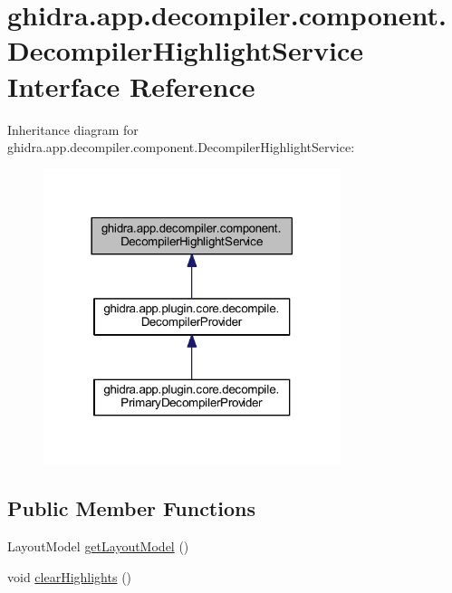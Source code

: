 \hypertarget{interfaceghidra_1_1app_1_1decompiler_1_1component_1_1_decompiler_highlight_service}{}\section{ghidra.\+app.\+decompiler.\+component.\+Decompiler\+Highlight\+Service Interface Reference}
\label{interfaceghidra_1_1app_1_1decompiler_1_1component_1_1_decompiler_highlight_service}


Inheritance diagram for ghidra.\+app.\+decompiler.\+component.\+Decompiler\+Highlight\+Service\+:
\nopagebreak
\begin{figure}[H]
\begin{center}
\leavevmode
\includegraphics[width=246pt]{interfaceghidra_1_1app_1_1decompiler_1_1component_1_1_decompiler_highlight_service__inherit__graph}
\end{center}
\end{figure}
\subsection*{Public Member Functions}
\begin{DoxyCompactItemize}
\item 
Layout\+Model \mbox{\hyperlink{interfaceghidra_1_1app_1_1decompiler_1_1component_1_1_decompiler_highlight_service_a684fe31c749767f23cc40d55d3159e0f}{get\+Layout\+Model}} ()
\item 
void \mbox{\hyperlink{interfaceghidra_1_1app_1_1decompiler_1_1component_1_1_decompiler_highlight_service_af99e44c458009975b48cd1974fd6e727}{clear\+Highlights}} ()
\end{DoxyCompactItemize}


